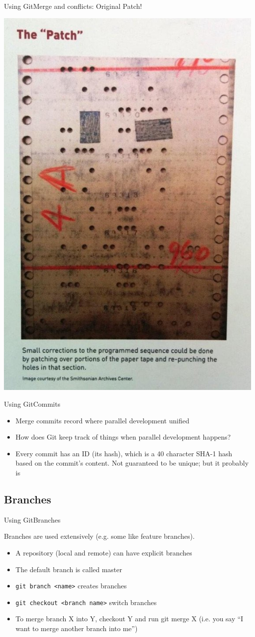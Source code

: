 \documentclass[10pt,compress]{beamer} %
\begin{document}
\begin{frame}{Using Git}{Merge and conflicts: Original Patch!}

\centering
\includegraphics[width=.4\textwidth,height=\textheight,keepaspectratio]{figs/patch.png}

\end{frame}


\begin{frame}{Using Git}{Commits}

\begin{itemize}
 \item Merge commits record where parallel development unified
 \item How does Git keep track of things when parallel development
happens?
\item Every commit has an ID (its hash), which is a 40 character SHA-1
hash based on the commit's content. Not guaranteed to be
unique; but it probably is
\end{itemize}

\end{frame}

\subsection{Branches}
\begin{frame}{Using Git}{Branches}

Branches are used extensively (e.g. some like feature branches).

\begin{itemize}
 \item A repository (local and remote) can have explicit branches
 \item The default branch is called master
 \item \texttt{git branch <name>} creates branches
 \item \texttt{git checkout <branch name>} switch branches
 \item To merge branch X into Y, checkout Y and run git merge X
(i.e. you say “I want to merge another branch into me”)
\end{itemize}

\end{frame}
\end{document}
